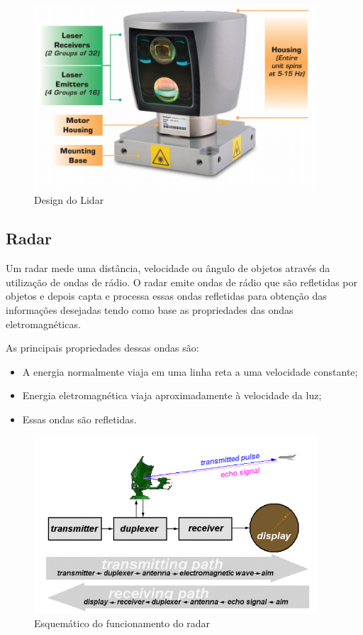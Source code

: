 \begin{figure}[h]
  \centering
  \includegraphics[width=400px, scale=1]{figuras/design_lidar}
  \caption{Design do Lidar}
\label{fig:design_lidar}
\end{figure}


\subsection{Radar}

Um radar mede uma distância, velocidade ou ângulo de objetos através da utilização de ondas de rádio. O radar emite ondas de rádio que são refletidas por objetos e depois capta e processa essas ondas refletidas para obtenção das informações desejadas tendo como base as propriedades das ondas eletromagnéticas.

As principais propriedades dessas ondas são:

\begin{itemize}
  \item A energia normalmente viaja em uma linha reta a uma velocidade constante;
  \item Energia eletromagnética viaja aproximadamente à velocidade da luz;
  \item Essas ondas são refletidas.
\end{itemize}

\begin{figure}[h]
  \centering
  \includegraphics[width=400px, scale=1]{figuras/funcionamento_radar}
  \caption{Esquemático do funcionamento do radar}
\label{fig:funcionamento_radar}
\end{figure}

